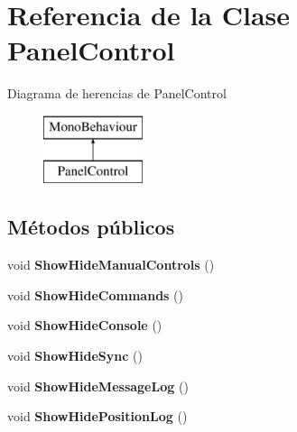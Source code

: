\hypertarget{class_panel_control}{}\section{Referencia de la Clase Panel\+Control}
\label{class_panel_control}
Diagrama de herencias de Panel\+Control\begin{figure}[H]
\begin{center}
\leavevmode
\includegraphics[height=2.000000cm]{class_panel_control}
\end{center}
\end{figure}
\subsection*{Métodos públicos}
\begin{DoxyCompactItemize}
\item 
\mbox{\label{class_panel_control_a1507903dbb7f0b7f49cb74b4b77247b2}} 
void {\bfseries Show\+Hide\+Manual\+Controls} ()
\item 
\mbox{\label{class_panel_control_ad1245999af785ac0aa3af3f1a6f40900}} 
void {\bfseries Show\+Hide\+Commands} ()
\item 
\mbox{\label{class_panel_control_a2890c74bb81afa4e93e6d698ae5f5721}} 
void {\bfseries Show\+Hide\+Console} ()
\item 
\mbox{\label{class_panel_control_a745d60a4ef5ace7f7691418081db8f94}} 
void {\bfseries Show\+Hide\+Sync} ()
\item 
\mbox{\label{class_panel_control_abd20147e23935b9f87a0b4508a2078c6}} 
void {\bfseries Show\+Hide\+Message\+Log} ()
\item 
\mbox{\label{class_panel_control_a5a25252b29b3ba097cc79778c42c469a}} 
void {\bfseries Show\+Hide\+Position\+Log} ()
\end{DoxyCompactItemize}


